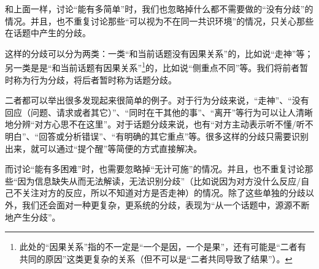 和上面一样，讨论“能有多简单”时，我们也忽略掉什么都不需要做的“没有分歧”的情况。并且，也不重复讨论那些“可以视为不在同一共识环境”的情况，只关心那些在话题中产生的分歧。
\begin{explain}
这样的分歧可以分为两类：一类“和当前话题没有因果关系”的，比如说“走神”等；另一类是是“和当前话题有因果关系”\footnote{此处的“因果关系”指的不一定是“一个是因，一个是果”，还有可能是“二者有共同的原因”这类更复杂的关系（但不可以是“二者共同导致了结果”）。}的，比如说“侧重点不同”等。我们将前者暂时称为行为分歧，将后者暂时称为话题分歧。

二者都可以举出很多发现起来很简单的例子。对于行为分歧来说，“走神”、“没有回应（问题、请求或者其它）”、“同时在干其他的事”、“离开”等行为可以让人清晰地分辨“对方心思不在这里”。对于话题分歧来说，也有“对方主动表示听不懂/听不明白”、“回答或分析错误”、“有明确的其它重点”等。很多这样的分歧只需要识别出来，就可以通过“提个醒”等简便的方式直接解决。
\end{explain}
而讨论“能有多困难”时，也需要忽略掉“无计可施”的情况。并且，也不重复讨论那些“因为信息缺失从而无法解读，无法识别分歧”（比如说因为对方没什么反应/自己不关注对方的反应，所以不知道对方是否走神）的情况。除了这些单独的分歧以外，我们还会面对一种更复杂，更系统的分歧，表现为“从一个话题中，源源不断地产生分歧”。
